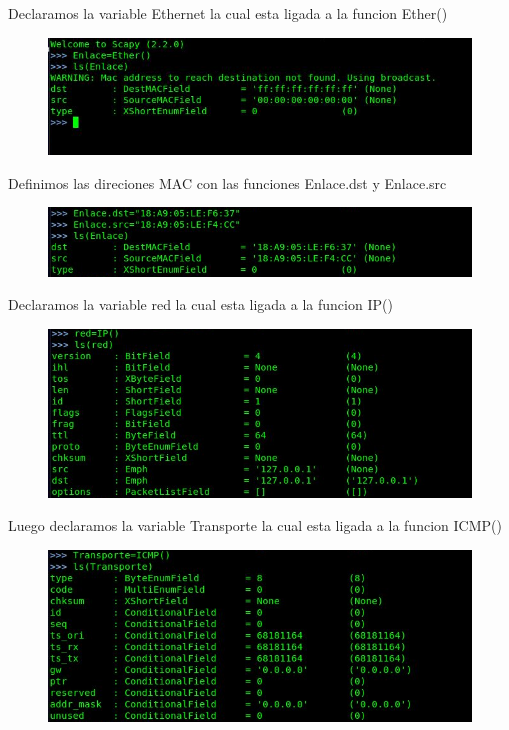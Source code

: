 \documentclass{udpreport}
\begin{document}
Declaramos la variable Ethernet la cual esta ligada a la funcion Ether()
\begin{figure}[H]
    \centering
    \includegraphics[scale=0.7]{images/ppaso2.png}
    \label{fig:my_label}
\end{figure}
Definimos las direciones MAC con las funciones  Enlace.dst y Enlace.src
\begin{figure}[H]
    \centering
    \includegraphics[scale=0.7]{images/ppaso0.png}
    \label{fig:my_label}
\end{figure}
\vspace{14cm}
Declaramos la variable red la cual esta ligada a la funcion IP()
\begin{figure}[H]
    \centering
    \includegraphics[scale=0.7]{images/ppaso3.png}
    \label{fig:my_label}
\end{figure}
Luego declaramos la variable Transporte la cual esta ligada a la funcion ICMP()
\begin{figure}[H]
    \centering
    \includegraphics[scale=0.7]{images/ppaso4.png}
    \label{fig:my_label}
\end{figure}
\end{document}
